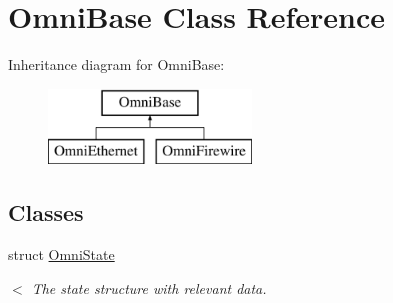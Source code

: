 \hypertarget{classOmniBase}{\section{Omni\-Base Class Reference}
\label{classOmniBase}
}
Inheritance diagram for Omni\-Base\-:\begin{figure}[H]
\begin{center}
\leavevmode
\includegraphics[height=2.000000cm]{classOmniBase}
\end{center}
\end{figure}
\subsection*{Classes}
\begin{DoxyCompactItemize}
\item 
struct \hyperlink{structOmniBase_1_1OmniState}{Omni\-State}
\begin{DoxyCompactList}\small\item\em $<$ The state structure with relevant data. \end{DoxyCompactList}\end{DoxyCompactItemize}
